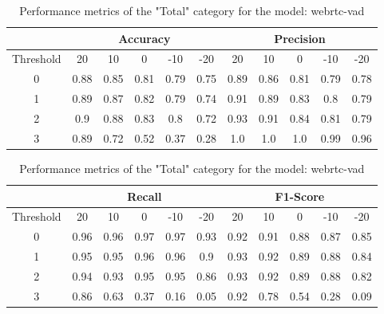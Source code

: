 \documentclass[../main.tex]{subfiles}
\begin{document}
\begin{table}[H]
\centering
\small
\begin{tabular}{ |c|c|c|c|c|c|c|c|c|c|c| }
\hline
    & \multicolumn{5}{|c|}{Accuracy} & \multicolumn{5}{|c|}{Precision} \\ 
\hline
Threshold & 20 & 10 & 0 & -10 & -20 & 20 & 10 & 0 & -10 & -20 \\ 
\hline
0& 0.88& 0.85& 0.81& 0.79& 0.75& 0.89& 0.86& 0.81& 0.79& 0.78 \\ 
1& 0.89& 0.87& 0.82& 0.79& 0.74& 0.91& 0.89& 0.83& 0.8& 0.79 \\ 
2& 0.9& 0.88& 0.83& 0.8& 0.72& 0.93& 0.91& 0.84& 0.81& 0.79 \\ 
3& 0.89& 0.72& 0.52& 0.37& 0.28& 1.0& 1.0& 1.0& 0.99& 0.96 \\ 
\hline
\end{tabular}
\begin{tabular}{ |c|c|c|c|c|c|c|c|c|c|c| }
\hline
    & \multicolumn{5}{|c|}{Recall} & \multicolumn{5}{|c|}{F1-Score} \\ 
\hline
Threshold & 20 & 10 & 0 & -10 & -20 & 20 & 10 & 0 & -10 & -20 \\ 
\hline
0& 0.96& 0.96& 0.97& 0.97& 0.93& 0.92& 0.91& 0.88& 0.87& 0.85 \\ 
1& 0.95& 0.95& 0.96& 0.96& 0.9& 0.93& 0.92& 0.89& 0.88& 0.84 \\ 
2& 0.94& 0.93& 0.95& 0.95& 0.86& 0.93& 0.92& 0.89& 0.88& 0.82 \\ 
3& 0.86& 0.63& 0.37& 0.16& 0.05& 0.92& 0.78& 0.54& 0.28& 0.09 \\ 
\hline
\end{tabular}
\caption{Performance metrics of the "Total" category for the model: webrtc-vad} 
\end{table}
\end{document}
